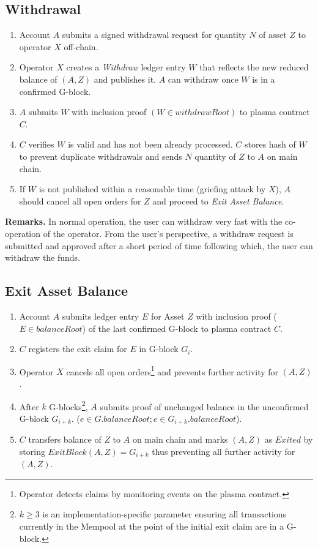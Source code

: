 \documentclass[12pt,a4paper]{article}
\begin{document}
\subsection{Withdrawal}\label{gp:withdrawal}
\begin{mdframed}
\begin{enumerate}
    \item Account $A$ submits a signed withdrawal request for quantity $N$ of asset $Z$ to operator $X$ off-chain. 
    \item Operator $X$ creates a \emph{Withdraw} ledger entry $W$ that reflects the new reduced balance of \((A, Z)\) and publishes it. $A$ can withdraw once $W$ is in a confirmed G-block.
    \item $A$ submits $W$ with inclusion proof \((W \in withdrawRoot)\) to plasma contract $C$. 
    \item $C$ verifies $W$ is valid and has not been already processed. $C$ stores hash of $W$ to prevent duplicate withdrawals and sends $N$ quantity of $Z$ to $A$ on main chain.
    \item If $W$ is not published within a reasonable time (griefing attack by $X$), $A$ should cancel all open orders for $Z$ and proceed to \emph{Exit Asset Balance}.
\end{enumerate}
\end{mdframed}


\textbf{Remarks.}
In normal operation, the user can withdraw very fast with the co-operation of the operator. From the user’s perspective, a withdraw request is submitted and approved after a short period of time following which, the user can withdraw the funds. 

\subsection{Exit Asset Balance}\label{gp:exit}
\begin{mdframed}
\begin{enumerate}
    \item Account $A$ submits ledger entry $E$ for Asset $Z$ with inclusion proof (\(E \in balanceRoot\)) of the last confirmed G-block to plasma contract $C$. 
    \item $C$ registers the exit claim for $E$ in G-block $G_i$.
    \item Operator $X$ cancels all open orders\footnote{Operator detects claims by monitoring events on the plasma contract.} and prevents further activity for \((A, Z)\).
    \item After $k$ G-blocks\footnote{\(k \geq 3\) is an implementation-specific parameter ensuring all transactions currently in the Mempool at the point of the initial exit claim are in a G-block.}, $A$ submits proof  of unchanged balance in the unconfirmed G-block $G_{i+k}$. (\(e \in G.balanceRoot; e \in G_{i+k}.balanceRoot\)).
    \item $C$ transfers balance of $Z$ to $A$ on main chain and marks \((A,Z)\) as $Exited$ by storing \(ExitBlock(A, Z) = G_{i+k}\) thus preventing all further activity for \((A, Z)\).
\end{enumerate}
\end{mdframed}
\end{document}
